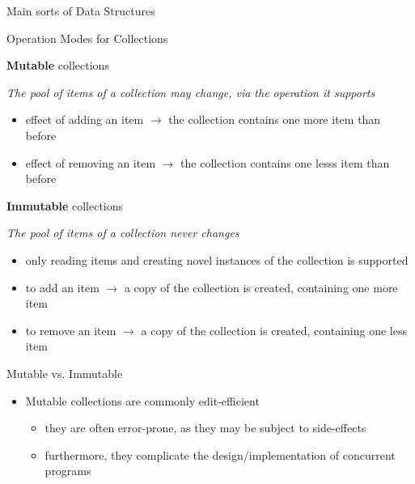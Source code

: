 \documentclass[presentation]{beamer}
\begin{document}
\begin{frame}[allowframebreaks]{Main sorts of Data Structures}
\end{frame}

\begin{frame}[allowframebreaks]{Operation Modes for Collections}
  \begin{block}{\textbf{Mutable} collections}
    \begin{center}\itshape
     The \alert{pool of items} of a collection \alert{may change}, via the operation it supports
    \end{center}
    \begin{itemize}
      \item effect of \alert{adding} an item $\rightarrow$ the collection contains \alert{one more item} than before
      \item effect of \alert{removing} an item $\rightarrow$ the collection contains \alert{one lesss item} than before
    \end{itemize}
  \end{block}

  \begin{block}{\textbf{Immutable} collections}
    \begin{center}\itshape
     The \alert{pool of items} of a collection \alert{never changes}
    \end{center}
    \begin{itemize}
      \item only \alert{reading items} and \alert{creating novel instances} of the collection is supported
      \item to \alert{add} an item $\rightarrow$ a \alert{copy} of the collection is \alert{created}, containing \alert{one more} item
      \item to \alert{remove} an item $\rightarrow$ a \alert{copy} of the collection is \alert{created}, containing \alert{one less} item
    \end{itemize}
  \end{block}

  \begin{alertblock}{Mutable vs. Immutable}
    \begin{itemize}
      \item Mutable collections are commonly \alert{edit-efficient}
      \begin{itemize}
        \item they are often \alert{error-prone}, as they may be subject to \alert{side-effects}
        \item furthermore, they complicate the design/implementation of \alert{concurrent} programs
      \end{itemize}


\end{itemize}
\end{alertblock}
\end{frame}
\end{document}
